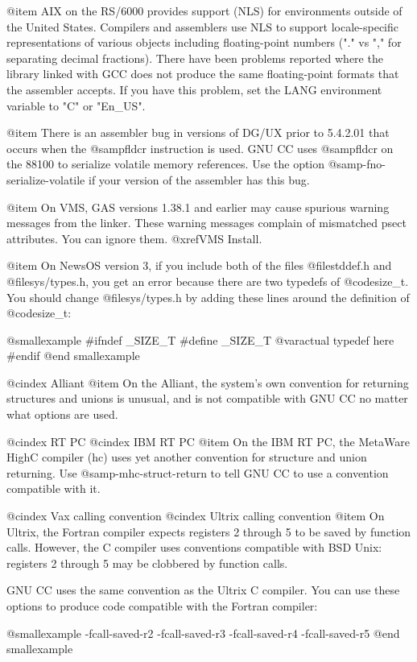 @item
AIX on the RS/6000 provides support (NLS) for environments outside of
the United States.  Compilers and assemblers use NLS to support
locale-specific representations of various objects including
floating-point numbers ("." vs "," for separating decimal fractions).
There have been problems reported where the library linked with GCC does
not produce the same floating-point formats that the assembler accepts.
If you have this problem, set the LANG environment variable to "C" or
"En_US".

@item
There is an assembler bug in versions of DG/UX prior to 5.4.2.01 that
occurs when the @samp{fldcr} instruction is used.  GNU CC uses
@samp{fldcr} on the 88100 to serialize volatile memory references.  Use
the option @samp{-fno-serialize-volatile} if your version of the
assembler has this bug.

@item
On VMS, GAS versions 1.38.1 and earlier may cause spurious warning
messages from the linker.  These warning messages complain of mismatched
psect attributes.  You can ignore them.  @xref{VMS Install}.

@item
On NewsOS version 3, if you include both of the files @file{stddef.h}
and @file{sys/types.h}, you get an error because there are two typedefs
of @code{size_t}.  You should change @file{sys/types.h} by adding these
lines around the definition of @code{size_t}:

@smallexample
#ifndef _SIZE_T
#define _SIZE_T
@var{actual typedef here}
#endif
@end smallexample

@cindex Alliant
@item
On the Alliant, the system's own convention for returning structures
and unions is unusual, and is not compatible with GNU CC no matter
what options are used.

@cindex RT PC
@cindex IBM RT PC
@item
On the IBM RT PC, the MetaWare HighC compiler (hc) uses yet another
convention for structure and union returning.  Use
@samp{-mhc-struct-return} to tell GNU CC to use a convention compatible
with it.

@cindex Vax calling convention
@cindex Ultrix calling convention
@item
On Ultrix, the Fortran compiler expects registers 2 through 5 to be saved
by function calls.  However, the C compiler uses conventions compatible
with BSD Unix: registers 2 through 5 may be clobbered by function calls.

GNU CC uses the same convention as the Ultrix C compiler.  You can use
these options to produce code compatible with the Fortran compiler:

@smallexample
-fcall-saved-r2 -fcall-saved-r3 -fcall-saved-r4 -fcall-saved-r5
@end smallexample

